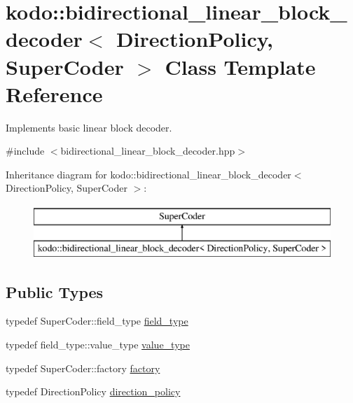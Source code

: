 \hypertarget{classkodo_1_1bidirectional__linear__block__decoder}{\section{kodo\-:\-:bidirectional\-\_\-linear\-\_\-block\-\_\-decoder$<$ Direction\-Policy, Super\-Coder $>$ Class Template Reference}
\label{classkodo_1_1bidirectional__linear__block__decoder}
}


Implements basic linear block decoder.  




{\ttfamily \#include $<$bidirectional\-\_\-linear\-\_\-block\-\_\-decoder.\-hpp$>$}

Inheritance diagram for kodo\-:\-:bidirectional\-\_\-linear\-\_\-block\-\_\-decoder$<$ Direction\-Policy, Super\-Coder $>$\-:\begin{figure}[H]
\begin{center}
\leavevmode
\includegraphics[height=2.000000cm]{classkodo_1_1bidirectional__linear__block__decoder}
\end{center}
\end{figure}
\subsection*{Public Types}
\begin{DoxyCompactItemize}
\item 
typedef Super\-Coder\-::field\-\_\-type \hyperlink{classkodo_1_1bidirectional__linear__block__decoder_a5d6e9f68290031d957869f332ff2bce4}{field\-\_\-type}
\begin{DoxyCompactList}\small\item\em \end{DoxyCompactList}\item 
typedef field\-\_\-type\-::value\-\_\-type \hyperlink{classkodo_1_1bidirectional__linear__block__decoder_a2039f4bd553ca7826a233080a7ecb230}{value\-\_\-type}
\begin{DoxyCompactList}\small\item\em \end{DoxyCompactList}\item 
typedef Super\-Coder\-::factory \hyperlink{classkodo_1_1bidirectional__linear__block__decoder_a479515a69e06401cff0c75f51bf52126}{factory}
\begin{DoxyCompactList}\small\item\em \end{DoxyCompactList}\item 
typedef Direction\-Policy \hyperlink{classkodo_1_1bidirectional__linear__block__decoder_aeb3af9a0a38bc5128d31d4e4a33be63f}{direction\-\_\-policy}
\end{DoxyCompactItemize}
